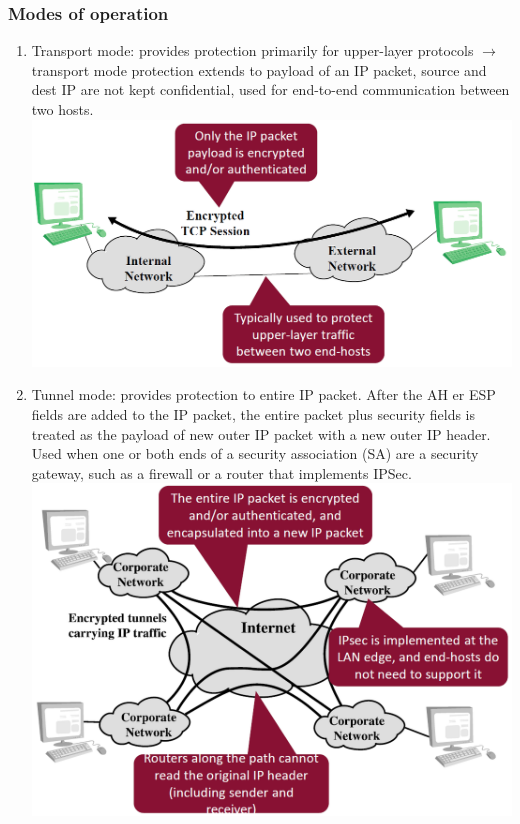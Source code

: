 \documentclass[12pt]{article}
\begin{document}
 \subsubsection{Modes of operation}
 \begin{enumerate}
 	\item Transport mode: provides protection primarily for upper-layer protocols $\rightarrow$ transport mode protection extends to payload of an IP packet, source and dest IP are not kept confidential, used for end-to-end communication between two hosts.\\
 	\includegraphics[width=0.8\linewidth]{./slides/L6P5MOD1.PNG}
 	\item Tunnel mode: provides protection to entire IP packet. After the AH er ESP fields are added to the IP packet, the entire packet plus security fields is treated as the payload of new outer IP packet with a new outer IP header. Used when one or both ends of a security association (SA) are a security gateway, such as a firewall or a router that implements IPSec.\\
 	\includegraphics[width=0.8\linewidth]{./slides/L6P5MOD2.png}
 \end{enumerate}
 
\end{document}
